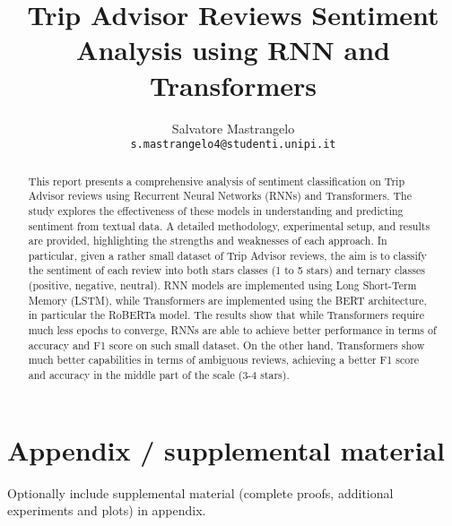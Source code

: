 \documentclass{article}
\title{Trip Advisor Reviews Sentiment Analysis using RNN and Transformers}
\author{%
  Salvatore Mastrangelo\\
  \texttt{s.mastrangelo4@studenti.unipi.it}
}
\begin{document}
\maketitle


\begin{abstract}
This report presents a comprehensive analysis of sentiment classification on Trip Advisor reviews using 
Recurrent Neural Networks (RNNs) and Transformers. The study explores the effectiveness of these models 
in understanding and predicting sentiment from textual data. A detailed methodology, experimental setup, 
and results are provided, highlighting the strengths and weaknesses of each approach. In particular,
given a rather small dataset of Trip Advisor reviews, the aim is to classify the sentiment of each review into both
stars classes (1 to 5 stars) and ternary classes (positive, negative, neutral). RNN models are implemented
using Long Short-Term Memory (LSTM), while Transformers are implemented using the BERT architecture, in
particular the RoBERTa model. The results show that while Transformers require much less epochs to 
converge, RNNs are able to achieve better performance in terms of accuracy and F1 score on such
small dataset. On the other hand, Transformers show much better capabilities in terms of ambiguous reviews, 
achieving a better F1 score and accuracy in the middle part of the scale (3-4 stars). 
\end{abstract}










\small


\appendix

\section{Appendix / supplemental material}


Optionally include supplemental material (complete proofs, additional experiments and plots) in appendix.
\end{document}
